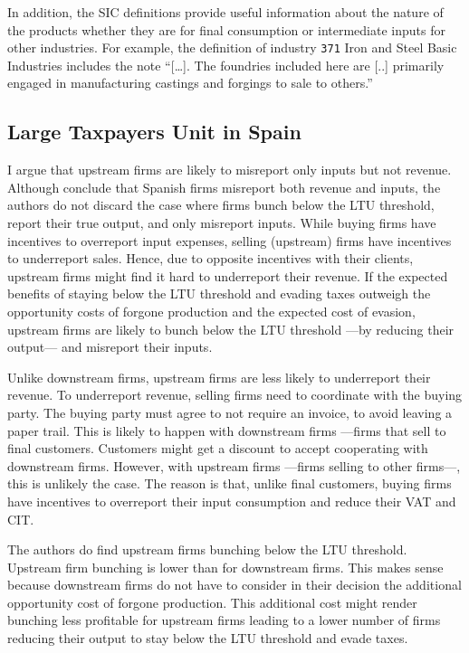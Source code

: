 \documentclass[
  12pt]{article}
\theoremstyle{definition}
\theoremstyle{remark}
\begin{document}
In addition, the SIC definitions provide useful information about the
nature of the products whether they are for final consumption or
intermediate inputs for other industries. For example, the definition of
industry \texttt{371} Iron and Steel Basic Industries includes the note
``{[}\ldots{]}. The foundries included here are {[}..{]} primarily
engaged in manufacturing castings and forgings to sale to others.''

\subsection{Large Taxpayers Unit in
Spain}\label{large-taxpayers-unit-in-spain}

I argue that upstream firms are likely to misreport only inputs but not
revenue. Although \citet{Almunia2018} conclude that Spanish firms
misreport both revenue and inputs, the authors do not discard the case
where firms bunch below the LTU threshold, report their true output, and
only misreport inputs. While buying firms have incentives to overreport
input expenses, selling (upstream) firms have incentives to underreport
sales. Hence, due to opposite incentives with their clients, upstream
firms might find it hard to underreport their revenue. If the expected
benefits of staying below the LTU threshold and evading taxes outweigh
the opportunity costs of forgone production and the expected cost of
evasion, upstream firms are likely to bunch below the LTU threshold
---by reducing their output--- and misreport their inputs.

Unlike downstream firms, upstream firms are less likely to underreport
their revenue. To underreport revenue, selling firms need to coordinate
with the buying party. The buying party must agree to not require an
invoice, to avoid leaving a paper trail. This is likely to happen with
downstream firms ---firms that sell to final customers. Customers might
get a discount to accept cooperating with downstream firms. However,
with upstream firms ---firms selling to other firms---, this is unlikely
the case. The reason is that, unlike final customers, buying firms have
incentives to overreport their input consumption and reduce their VAT
and CIT.

The authors do find upstream firms bunching below the LTU threshold.
Upstream firm bunching is lower than for downstream firms. This makes
sense because downstream firms do not have to consider in their decision
the additional opportunity cost of forgone production. This additional
cost might render bunching less profitable for upstream firms leading to
a lower number of firms reducing their output to stay below the LTU
threshold and evade taxes.
\end{document}
